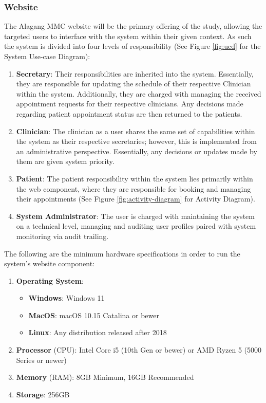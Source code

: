 \documentclass[11pt,a4paper,titlepage]{article}
\begin{document}
	\subsubsection{Website}
	The Alagang MMC website will be the primary offering of the study, allowing the targeted users to interface with the system within their given context. As such the system is divided into four levels of responsibility (See Figure \ref{fig:ucd} for the System Use-case Diagram): 
	\begin{enumerate}
		\item \textbf{Secretary}: Their responsibilities are inherited into the system. Essentially, they are responsible for updating the schedule of their respective Clinician within the system. Additionally, they are charged with managing the received appointment requests for their respective clinicians. Any decisions made regarding patient appointment status are then returned to the patients.
		\item \textbf{Clinician}: The clinician as a user shares the same set of capabilities within the system as their respective secretaries; however, this is implemented from an administrative perspective. Essentially, any decisions or updates made by them are given system priority. 
		\item \textbf{Patient}: The patient responsibility within the system lies primarily within the web component, where they are responsible for booking and managing their appointments (See Figure \ref{fig:activity-diagram} for Activity Diagram).
		\item \textbf{System Administrator}: The user is charged with maintaining the system on a technical level, managing and auditing user profiles paired with system monitoring via audit trailing. 
	\end{enumerate}
	The following are the minimum hardware specifications in order to run the system's website component: 
	\begin{enumerate}
		\item \textbf{Operating System}:
		\begin{itemize}
			\item \textbf{Windows}: Windows 11 
			\item \textbf{MacOS}: macOS 10.15 Catalina or bewer
			\item \textbf{Linux}: Any distribution released after 2018
		\end{itemize}
		\item \textbf{Processor} (CPU): Intel Core i5 (10th Gen or bewer) or AMD Ryzen 5 (5000 Series or newer)
		\item \textbf{Memory} (RAM): 8GB Minimum, 16GB Recommended
		\item \textbf{Storage}: 256GB 
	\end{enumerate}
\end{document}
